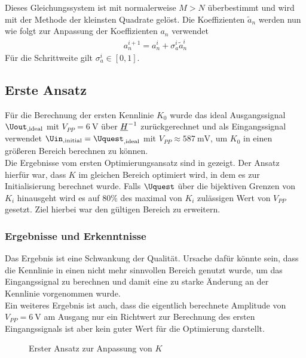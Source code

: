 \documentclass[../Report.tex]{subfiles}
\begin{document}
Dieses Gleichungssystem ist mit normalerweise $M>N$ überbestimmt und wird mit der Methode der kleinsten Quadrate gelöst. Die Koeffizienten $\tilde{a}_n$ werden nun wie folgt zur Anpassung der Koeffizienten $a_n$ verwendet
\begin{align}
	\label{eq:opt.adjusta}
	a_n^{i+1} = a_n^{i} + \sigma_{a}^{i} \tilde{a}_n^{i}
\end{align}
Für die Schrittweite gilt $\sigma_{a}^i \in \left[ 0 , 1 \right]$.

\subsection{Erste Ansatz}
\label{subsec:opt.adjusta.results}
Für die Berechnung der ersten Kennlinie $K_0$ wurde das ideal Ausgangssignal $\Uout_{, \mathrm{ideal}}$ mit $V_{PP} = \SI{6}{\V}$ über $\underline{H}^{-1}$ zurückgerechnet und als Eingangssignal verwendet $\Uin_{, \mathrm{initial }} = \Uquest_{, \mathrm{ideal}}$ mit $V_{PP} \approx \SI{587}{\mV}$, um $K_0$ in einen größeren Bereich berechnen zu können.\\
Die Ergebnisse vom ersten Optimierungsansatz sind in  gezeigt. Der Ansatz hierfür war, dass $K$ im gleichen Bereich optimiert wird, in dem es zur Initialisierung berechnet wurde. Falls $\Uquest$ über die bijektiven Grenzen von $K_i$ hinausgeht wird es auf $80\%$ des maximal von $K_i$ zulässigen Wert von $V_{PP}$ gesetzt. Ziel hierbei war den gültigen Bereich zu erweitern.
\subsubsection*{Ergebnisse und Erkenntnisse}
\label{subsubsec:opt.adjusta.results}
Das Ergebnis ist eine Schwankung der Qualität. Ursache dafür könnte sein, dass die Kennlinie in einen nicht mehr sinnvollen Bereich genutzt wurde, um das Eingangssignal zu berechnen und damit eine zu starke Änderung an der Kennlinie vorgenommen wurde. \\
Ein weiteres Ergebnis ist auch, dass die eigentlich berechnete Amplitude von $V_{PP} = \SI{6}{\V}$ am Ausgang nur ein Richtwert zur Berechnung des ersten Eingangssignals ist aber kein guter Wert für die Optimierung darstellt.
\begin{figure}[H]
\begin{subfigure}{0.5 \textwidth}
    \newlength\figureheight
	\newlength\figurewidth
	\setlength\figureheight{8cm}
	\setlength\figurewidth{8cm}
    
	\label{fig:evaluate30K}
\end{subfigure}
\begin{subfigure}{0.5 \textwidth}
	\setlength\figureheight{8cm}
	\setlength\figurewidth{8cm}
    
	\label{fig:evaluate30Q}
\end{subfigure}
\label{fig:opt.evaluate30}
\caption{Erster Ansatz zur Anpassung von $K$}
\end{figure}
\end{document}
